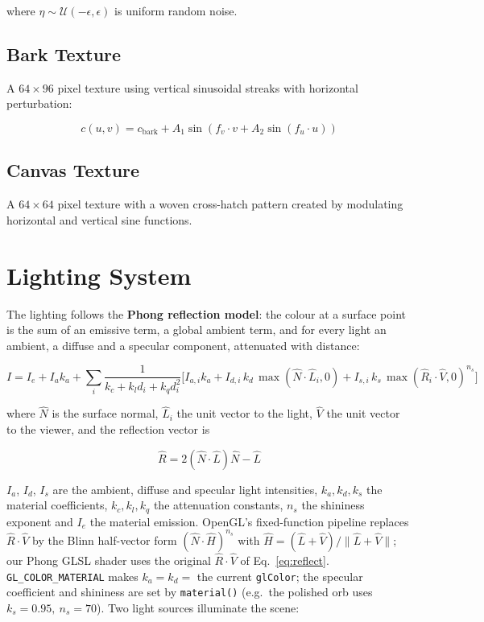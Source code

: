 \documentclass[12pt,a4paper]{report}
\begin{document}
where $\eta \sim \mathcal{U}(-\epsilon, \epsilon)$ is uniform random noise.

\subsection{Bark Texture}

A $64 \times 96$ pixel texture using vertical sinusoidal streaks with horizontal perturbation:

\begin{equation}
c(u,v) = c_{\text{bark}} + A_1 \sin(f_v \cdot v + A_2 \sin(f_u \cdot u))
\label{eq:barktex}
\end{equation}

\subsection{Canvas Texture}

A $64 \times 64$ pixel texture with a woven cross-hatch pattern created by modulating horizontal and vertical sine functions.

\section{Lighting System}

The lighting follows the \textbf{Phong reflection model}: the colour at a surface point is the sum of an emissive term, a global ambient term, and for every light an ambient, a diffuse and a specular component, attenuated with distance:

\begin{equation}
I = I_e + I_{a}k_a + \sum_{i} \frac{1}{k_c + k_l d_i + k_q d_i^2} \Big[ I_{a,i}k_a + I_{d,i}\,k_d\,\max(\hat{N}\!\cdot\!\hat{L}_i,0) + I_{s,i}\,k_s\,\max(\hat{R}_i\!\cdot\!\hat{V},0)^{n_s} \Big]
\label{eq:blinnphong}
\end{equation}

where $\hat{N}$ is the surface normal, $\hat{L}_i$ the unit vector to the light, $\hat{V}$ the unit vector to the viewer, and the reflection vector is

\begin{equation}
\hat{R} = 2(\hat{N}\!\cdot\!\hat{L})\hat{N} - \hat{L}
\label{eq:reflect}
\end{equation}

$I_a$, $I_d$, $I_s$ are the ambient, diffuse and specular light intensities, $k_a,k_d,k_s$ the material coefficients, $k_c,k_l,k_q$ the attenuation constants, $n_s$ the shininess exponent and $I_e$ the material emission.
OpenGL's fixed-function pipeline replaces $\hat{R}\!\cdot\!\hat{V}$ by the Blinn half-vector form $(\hat{N}\!\cdot\!\hat{H})^{n_s}$ with $\hat{H}=(\hat{L}+\hat{V})/\lVert\hat{L}+\hat{V}\rVert$; our Phong GLSL shader uses the original $\hat{R}\!\cdot\!\hat{V}$ of Eq.~\ref{eq:reflect}.
\texttt{GL\_COLOR\_MATERIAL} makes $k_a=k_d=$ the current \texttt{glColor}; the specular coefficient and shininess are set by \texttt{material()} (e.g.\ the polished orb uses $k_s=0.95,\ n_s=70$).
Two light sources illuminate the scene:
\end{document}
